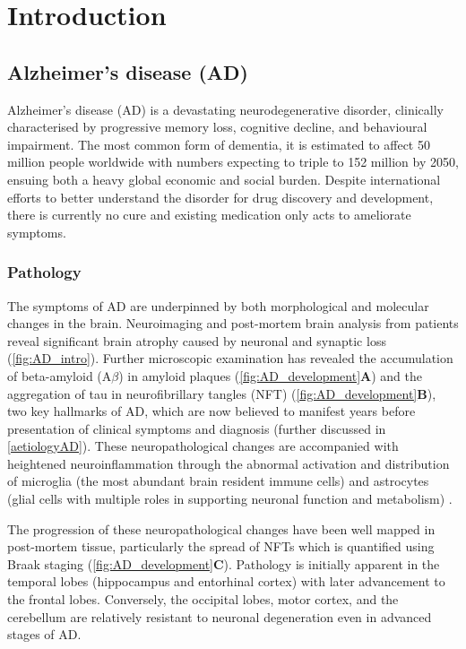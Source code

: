 \chapter{Introduction}

\section{Alzheimer's disease (AD)}

Alzheimer’s disease (AD) is a devastating neurodegenerative disorder, clinically characterised by progressive memory loss, cognitive decline, and behavioural impairment. The most common form of dementia, it is estimated to affect 50 million people worldwide with numbers expecting to triple to 152 million by 2050, ensuing both a heavy global economic and social burden\cite{International2020}. Despite international efforts to better understand the disorder for drug discovery and development, there is currently no cure and existing medication only acts to ameliorate symptoms.

\subsection{Pathology}
\label{ch1: ad_pathology}
The symptoms of AD are underpinned by both morphological and molecular changes in the brain. Neuroimaging and post-mortem brain analysis from patients reveal significant brain atrophy caused by neuronal and synaptic loss\cite{Selkoe1991,Perl2010} (\cref{fig:AD_intro}). Further microscopic examination has revealed the accumulation of beta-amyloid (A$\beta$) in amyloid plaques (\cref{fig:AD_development}\textbf{A}) and the aggregation of tau in neurofibrillary tangles (NFT) (\cref{fig:AD_development}\textbf{B}), two key hallmarks of AD, which are now believed to manifest years before presentation of clinical symptoms and diagnosis \cite{Sperling2011} (further discussed in \cref{aetiologyAD}). These neuropathological changes are accompanied with heightened neuroinflammation through the abnormal activation and distribution of microglia (the most abundant brain resident immune cells) and astrocytes (glial cells with multiple roles in supporting neuronal function and metabolism) \cite{Heneka2015}. 

The progression of these neuropathological changes have been well mapped in post-mortem tissue, particularly the spread of NFTs which is quantified using Braak staging\cite{H1991} (\cref{fig:AD_development}\textbf{C}). Pathology is initially apparent in the temporal lobes (hippocampus and entorhinal cortex) with later advancement to the frontal lobes. Conversely, the occipital lobes, motor cortex, and the cerebellum are relatively resistant to neuronal degeneration even in advanced stages of AD\cite{Xu2019}.

